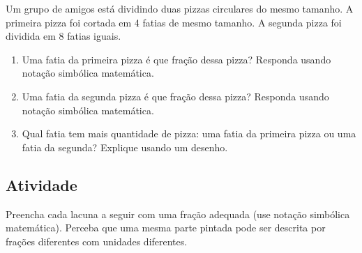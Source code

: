 Um grupo de amigos está dividindo duas pizzas circulares do mesmo tamanho. A primeira pizza foi cortada em 4 fatias de mesmo tamanho. A segunda pizza foi dividida em 8 fatias iguais.

\begin{enumerate} [\quad a)] %
  \item     Uma fatia da primeira pizza é que fração dessa pizza? Responda usando notação simbólica matemática.
  \item     Uma fatia da segunda pizza é que fração dessa pizza? Responda usando notação simbólica matemática.
  \item     Qual fatia tem mais quantidade de pizza: uma fatia da primeira pizza ou uma fatia da segunda? Explique usando um desenho.
\end{enumerate} %

\subsection{Atividade}

Preencha cada lacuna a seguir com uma fração adequada (use notação simbólica matemática). Perceba que uma mesma parte pintada pode ser descrita por frações diferentes com unidades diferentes.

\def \tripinha{ (30:4) -- (90:4) -- (150:4)--(210:4)--(270:4)--(330:4) [shift={({4*sqrt(3)},0)}] --(270:4) -- (330:4) -- (30:4) -- (90:4)--(150:4)--cycle;}
\def \tripa{ (30:4) -- (90:4) -- (150:4)--(210:4)--(270:4)--(330:4) [shift={({4*sqrt(3)},0)}] --(270:4) -- (330:4) [shift={({4*sqrt(3)},0)}]--  (270:4) -- (330:4) -- (30:4) -- (90:4)--(150:4) [shift={({-4*sqrt(3)},0)}] -- (90:4) -- (150:4)--cycle;}

